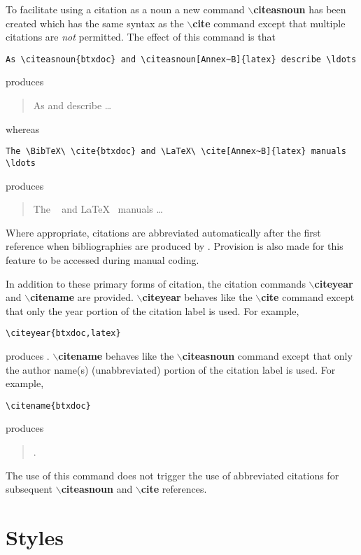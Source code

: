 To facilitate using a citation as a noun a new command
{\bf $\backslash$citeasnoun} has been created which has the same syntax as the
{\bf $\backslash$cite} command except that multiple citations are {\em not}
permitted.
The effect of this command is that
\begin{verbatim}
As \citeasnoun{btxdoc} and \citeasnoun[Annex~B]{latex} describe \ldots
\end{verbatim}
produces
\begin{quote}
As  and  describe \ldots
\end{quote}
whereas
\begin{verbatim}
The \BibTeX\ \cite{btxdoc} and \LaTeX\ \cite[Annex~B]{latex} manuals \ldots
\end{verbatim}
produces
\begin{quote}
The \BibTeX\ \cite{btxdoc} and \LaTeX\ \cite[Annex~B]{latex} manuals \ldots
\end{quote}

Where appropriate, citations are abbreviated automatically after the first
reference when bibliographies are produced by \BibTeX.
Provision is also made for this feature to be accessed during manual coding.

In addition to these primary forms of citation, the citation commands
{\bf $\backslash$citeyear} and {\bf $\backslash$citename} are provided.
{\bf $\backslash$citeyear} behaves like the
{\bf $\backslash$cite} command except that only the year portion of the
citation label is used.
For example,
\begin{verbatim}
\citeyear{btxdoc,latex}
\end{verbatim}
produces \citeyear{btxdoc,latex}.
{\bf $\backslash$citename} behaves like the
{\bf $\backslash$citeasnoun} command except that only the author name(s)
(unabbreviated) portion of the citation label is used.
For example,
\begin{verbatim}
\citename{btxdoc}
\end{verbatim}
produces
\begin{quote}
.
\end{quote}
The use of this command does not trigger the use of abbreviated citations for
subsequent {\bf $\backslash$citeasnoun} and {\bf $\backslash$cite}
references.

\section{Styles}

